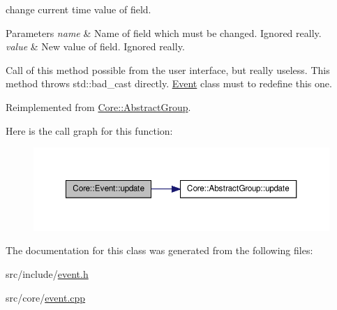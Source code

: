 change current time value of field. 


\begin{DoxyParams}{Parameters}
{\em name} & Name of field which must be changed. Ignored really. \\
\hline
{\em value} & New value of field. Ignored really.\\
\hline
\end{DoxyParams}
Call of this method possible from the user interface, but really useless. This method throws std::bad\_\-cast directly. \hyperlink{classCore_1_1Event}{Event} class must to redefine this one. 

Reimplemented from \hyperlink{classCore_1_1AbstractGroup_a9891a3850584dc3677563aea603fb9c2}{Core::AbstractGroup}.



Here is the call graph for this function:
\nopagebreak
\begin{figure}[H]
\begin{center}
\leavevmode
\includegraphics[width=362pt]{d9/d42/classCore_1_1Event_aaa4b9def6b65cc896e0054210b2d5dae_cgraph}
\end{center}
\end{figure}




The documentation for this class was generated from the following files:\begin{DoxyCompactItemize}
\item 
src/include/\hyperlink{event_8h}{event.h}\item 
src/core/\hyperlink{event_8cpp}{event.cpp}\end{DoxyCompactItemize}
